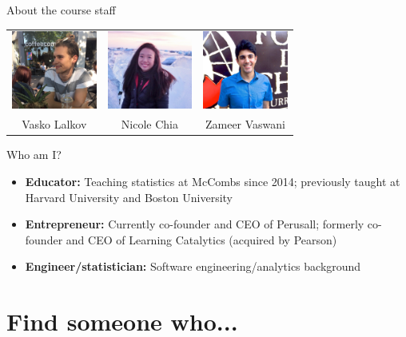 \documentclass{beamer}\usepackage[]{graphicx}\usepackage[]{color}
\begin{document}
\begin{darkframes}
\begin{frame}{About the course staff}
\begin{itemize}
          \vspace{0.2in}
          \begin{center}
            \begin{tabular}{ccc}
              \includegraphics[width=1.1in]{vasko} &
              \includegraphics[width=1.1in]{nicole} &
              \includegraphics[width=1.1in]{zameer} \\
              Vasko Lalkov & Nicole Chia & Zameer Vaswani \\
            \end{tabular}
          \end{center}
      \end{itemize}
    \end{frame}

    \begin{frame}{Who am I?}
      \begin{itemize}
        \item \textbf{Educator:} Teaching statistics at McCombs since 2014; previously taught at Harvard University and Boston University
        \item \textbf{Entrepreneur:} Currently co-founder and CEO of Perusall; formerly co-founder and CEO of Learning Catalytics (acquired by Pearson)
        \item \textbf{Engineer/statistician:} Software engineering/analytics background
      \end{itemize}
    \end{frame}

    \section{Find someone who...}


\end{darkframes}
\end{document}
